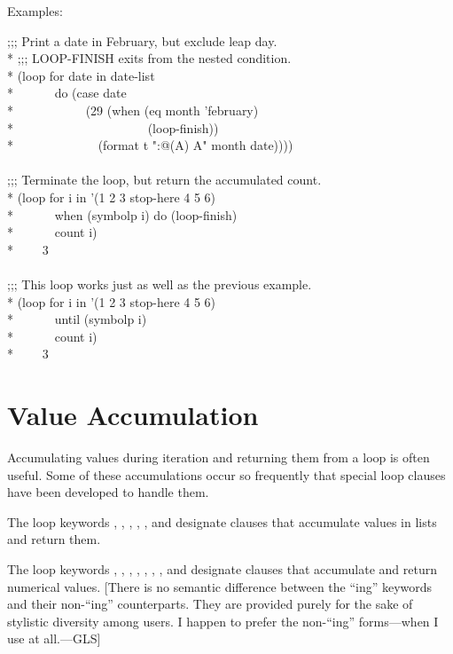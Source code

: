 \begin{new}
\begin{defmac}
Examples:
\begin{lisp}
;;; Print a date in February, but exclude leap day. \\*
;;; LOOP-FINISH exits from the nested condition. \\*
(loop for date in date-list \\*
~~~~~~do (case date \\*
~~~~~~~~~~~(29 (when (eq month 'february) \\*
~~~~~~~~~~~~~~~~~~~~~(loop-finish)) \\*
~~~~~~~~~~~~~(format t "{\Xtilde}:@({\Xtilde}A{\Xtilde}) {\Xtilde}A" month date)))) \\
 \\
;;; Terminate the loop, but return the accumulated count. \\*
(loop for i in '(1 2 3 stop-here 4 5 6) \\*
~~~~~~when (symbolp i) do (loop-finish) \\*
~~~~~~count i) \\*
~~~\EV~3 \\
 \\
;;; This loop works just as well as the previous example. \\*
(loop for i in '(1 2 3 stop-here 4 5 6) \\*
~~~~~~until (symbolp i) \\*
~~~~~~count i) \\*
~~~\EV~3
\end{lisp}
\end{defmac}

\section{Value Accumulation}
\label{LOOP-ACCUM-SECTION}

Accumulating values during iteration and returning them from a loop
is often useful.  Some of these accumulations occur so
frequently that special loop clauses have been developed to handle them.

The loop keywords , ,
, ,
, and 
designate clauses that
accumulate values in lists and return them.

The loop keywords , ,
, ,
, ,
, and 
designate clauses that accumulate and
return numerical values.
[There is no semantic difference between the ``ing'' keywords and their non-``ing''
counterparts.  They are provided purely for the sake of stylistic diversity among users.
I happen to prefer the non-``ing'' forms---when I use  at all.---GLS]


\end{new}
